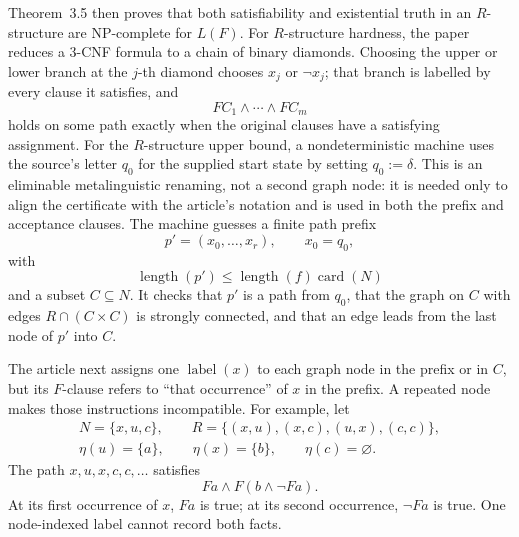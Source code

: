 Theorem~3.5 then proves that both satisfiability and existential truth in an
\(R\)-structure are NP-complete for \(L(F)\).  For \(R\)-structure hardness,
the paper reduces a 3-CNF formula to a chain of binary diamonds.  Choosing the
upper or lower branch at the \(j\)-th diamond chooses \(x_j\) or
\(\neg x_j\); that branch is labelled by every clause it satisfies, and
\[
 FC_1\land\cdots\land FC_m
\]
holds on some path exactly when the original clauses have a satisfying
assignment.  For the \(R\)-structure upper bound, a nondeterministic machine
uses the source's letter \(q_0\) for the supplied start state by setting
\(q_0:=\delta\).  This is an eliminable metalinguistic renaming, not a second
graph node: it is needed only to align the certificate with the article's
notation and is used in both the prefix and acceptance clauses.  The machine
guesses a finite path prefix
\[
 p'=(x_0,\ldots,x_r),\qquad x_0=q_0,
\]
with
\[
 \operatorname{length}(p')
 \le \operatorname{length}(f)\operatorname{card}(N)
\]
and a subset \(C\subseteq N\).  It checks that \(p'\) is a path from \(q_0\),
that the graph on \(C\) with edges \(R\cap(C\times C)\) is strongly
connected, and that an edge leads from the last node of \(p'\) into \(C\).

The article next assigns one \(\operatorname{label}(x)\) to each graph node in
the prefix or in \(C\), but its \(F\)-clause refers to ``that occurrence'' of
\(x\) in the prefix.  A repeated node makes those instructions incompatible.
For example, let
\[
 \begin{gathered}
  N=\{x,u,c\},\qquad
  R=\{(x,u),(x,c),(u,x),(c,c)\},\\
  \eta(u)=\{a\},\qquad \eta(x)=\{b\},\qquad \eta(c)=\varnothing .
 \end{gathered}
\]
The path \(x,u,x,c,c,\ldots\) satisfies
\[
 Fa\land F(b\land\neg Fa).
\]
At its first occurrence of \(x\), \(Fa\) is true; at its second occurrence,
\(\neg Fa\) is true.  One node-indexed label cannot record both facts.

